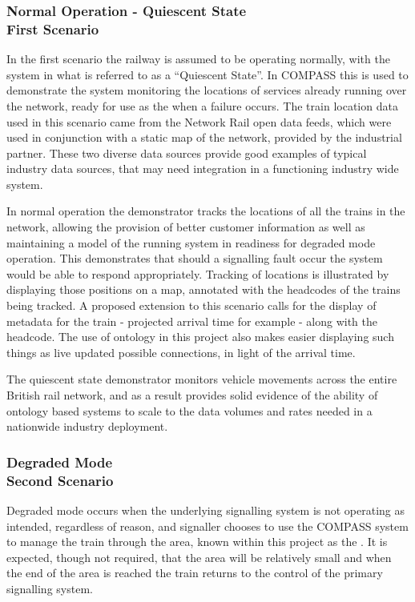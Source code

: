 \subsubsection[Normal Operation]{Normal Operation - Quiescent State \\ First Scenario}
In the first scenario the railway is assumed to be operating normally, with the system in what is referred to as a ``Quiescent State''. In COMPASS this is used to demonstrate the system  monitoring the locations of services already running over the network, ready for use as the  when a failure occurs. The train location data used in this scenario came from the Network Rail open data feeds, which were used in conjunction with a static map of the network, provided by the industrial partner. These two diverse data sources provide good examples of typical industry data sources, that may need integration in a functioning industry wide system. 

In normal operation the demonstrator tracks the locations of all the trains in the network, allowing the provision of better customer information as well as maintaining a model of the running system in readiness for degraded mode operation. This demonstrates that should a signalling fault occur the system would be able to respond appropriately. Tracking of locations is illustrated by displaying those positions on a map, annotated with the headcodes of the trains being tracked. A proposed extension to this scenario calls for the display of metadata for the train - projected arrival time for example - along with the headcode. The use of ontology in this project also makes easier displaying such things as live updated possible connections, in light of the arrival time. 

The quiescent state demonstrator monitors vehicle movements across the entire British rail network, and as a result provides solid evidence of the ability of ontology based systems to scale to the data volumes and rates needed in a nationwide industry deployment.

\subsubsection[Degraded Mode]{Degraded Mode \\ Second Scenario}
Degraded mode occurs when the underlying signalling system is not operating as intended, regardless of reason, and signaller chooses to use the COMPASS system to manage the train through the area, known within this project as the . It is expected, though not required, that the area will be relatively small and when the end of the area is reached the train returns to the control of the primary signalling system. 


